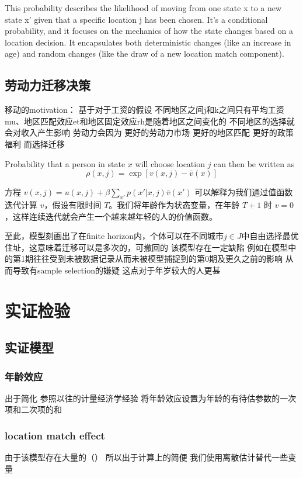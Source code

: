 \documentclass{article}
\numberwithin{equation}{section} %
\begin{document}
This probability describes the likelihood of moving from one state x to a new state x' given that a specific location j has been chosen. It's a conditional probability, and it focuses on the mechanics of how the state changes based on a location decision. It encapsulates both deterministic changes (like an increase in age) and random changes (like the draw of a new location match component).


\subsection{劳动力迁移决策}
移动的motivation：
基于对于工资的假设
不同地区之间j和k之间只有平均工资mu、地区匹配效应et和地区固定效应rh是随着地区之间变化的
不同地区的选择就会对收入产生影响
劳动力会因为
更好的劳动力市场
更好的地区匹配
更好的政策福利
而选择迁移


Probability that a person in state $x$ will choose location $j$ can then be written as
$$\rho(x,j)=\exp[v(x,j)-\bar v(x)]$$

方程 $v(x, j) = u(x, j) + \beta \sum_{x'} p(x' | x, j) \bar{v}(x')$ 可以解释为我们通过值函数迭代计算 $v$，假设有限时间 $T$。我们将年龄作为状态变量，在年龄 $T+1$ 时 $v=0$，这样连续迭代就会产生一个越来越年轻的人的价值函数。


至此，模型刻画出了在finite horizon内，个体可以在不同城市$j\in J$中自由选择最优住址，这意味着迁移可以是多次的，可撤回的
该模型存在一定缺陷
例如在模型中的第1期往往受到未被数据记录从而未被模型捕捉到的第0期及更久之前的影响
从而导致有sample selection的嫌疑
这点对于年岁较大的人更甚


\section{实证检验}

\subsection{实证模型} %
\label{sub:实证模型}
\subsubsection{年龄效应}
出于简化
参照以往的计量经济学经验
将年龄效应设置为年龄的有待估参数的一次项和二次项的和

\subsubsection{location match effect}
由于该模型存在大量的（）
所以出于计算上的简便
我们使用离散估计替代一些变量
\end{document}
